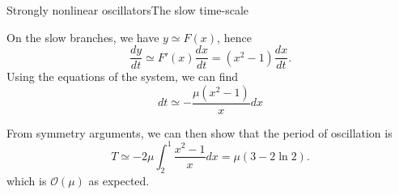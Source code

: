 \documentclass[usenames,dvipsnames,svgnames,10pt,aspectratio=169]{beamer}
\begin{document}
\begin{frame}[t, c]{Strongly nonlinear oscillators}{The slow time-scale}
  \begin{minipage}{.58\textwidth}
    \begin{overprint}
      On the slow branches, we have $y \simeq F(x)$, hence
      \[
      \dfrac{dy}{dt} \simeq F'(x) \dfrac{dx}{dt} = \left( x^2 - 1 \right) \dfrac{dx}{dt}.
      \]
      Using the equations of the system, we can find
      \[
      dt \simeq -\dfrac{\mu \left( x^2 - 1 \right)}{x} dx
      \]

      From symmetry arguments, we can then show that the period of oscillation is
      \[
      T \simeq -2\mu \int_{2}^{1} \dfrac{x^2 - 1}{x} dx = \mu \left( 3 - 2 \ln 2 \right).
      \]
      which is $\mathcal{O}(\mu)$ as expected.

    \end{overprint}
  \end{minipage}%
  \hfill
  \begin{minipage}{.38\textwidth}
    \centering
  \end{minipage}

\end{frame}
\end{document}
